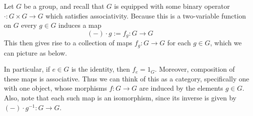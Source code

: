     \begin{example}
        Let $G$ be a group, and recall that $G$ is equipped with some binary 
        operator $\cdot: G \times G \to G$ which satisfies associativity. 
        Because this is a two-variable function on $G$ every 
        $g \in G$ induces a map
        \[
            (-) \cdot g := f_g: G \to G \qquad 
        \]
        This then gives rise to a collection of maps $f_g: G \to G$ for each 
        $g \in G$, which we can picture as below. 
        \begin{center}
        \end{center}
        In particular, if $e\in G$ is the identity, then $f_e = 1_G$. 
        Moreover, composition of these maps is associative.
        Thus we can think of this as a category, specifically 
        one with one object, whose morphisms $f:G \to G$ are induced
        by the elements $g \in G$.
        Also, note that each such map is an isomorphism, since its inverse 
        is given by $(-) \cdot g^{-1}: G \to G$. 


\end{example}
